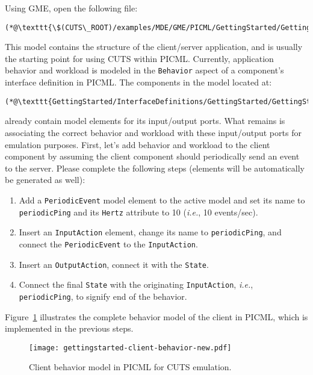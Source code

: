 Using GME, open the following file: 
\begin{lstlisting}
(*@\texttt{\$(CUTS\_ROOT)/examples/MDE/GME/PICML/GettingStarted/GettingStarted.xme}@*)
\end{lstlisting}
This model contains the structure of the client/\-server application, and 
is usually the starting point for using CUTS within PICML. 
Currently, application behavior and workload is modeled in the \texttt{Behavior}
aspect of a component's interface definition in PICML. The components in the model
located at:
\begin{lstlisting}
(*@\texttt{GettingStarted/InterfaceDefinitions/GettingStarted/GettingStarted}@*)
\end{lstlisting}
already contain model elements for its input/\-output ports. What remains is associating
the correct behavior and workload with these input/\-output ports for emulation
purposes. First, let's add behavior and workload to the client component by 
assuming the client component should periodically send an event to the server.
Please complete the following steps (elements will be automatically be generated
as well):
\begin{enumerate}
  \item Add a \texttt{PeriodicEvent} model element to the active model and 
  set its name to \texttt{periodicPing} and its \texttt{Hertz} attribute to 
  10 (\textit{i.e.}, 10 events/sec). 
  
  \item Insert an \texttt{InputAction} element, change its name to 
  \texttt{periodicPing}, and connect the \texttt{PeriodicEvent} to 
  the \texttt{InputAction}.

  \item Insert an \texttt{OutputAction}, connect it with the \texttt{State}.

  \item Connect the final \texttt{State} with the originating \texttt{InputAction},
  \textit{i.e.}, \texttt{periodicPing}, to signify end of the behavior.
\end{enumerate}
Figure~\ref{fig:gettingstarted-client-behavior} illustrates the complete behavior 
model of the client in PICML, which is implemented in the previous steps.
\begin{figure}[htbp]
  \centering
  \texttt{[image: gettingstarted-client-behavior-new.pdf]}
  \caption{Client behavior model in PICML for CUTS emulation.}
  \label{fig:gettingstarted-client-behavior}
\end{figure}

